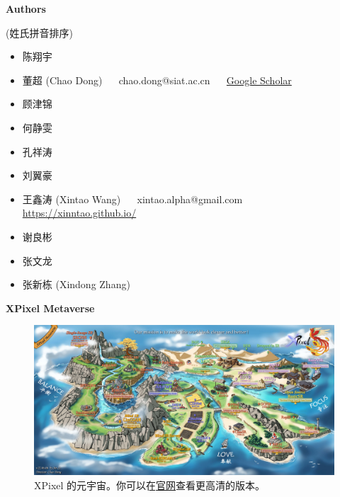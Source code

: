 \documentclass[../main.tex]{subfiles}
\begin{document}
\newpage

{\Large\textbf{Authors}}

(姓氏拼音排序)

\begin{itemize}
	\item 陈翔宇
	\item 董超 (Chao Dong) ~~ chao.dong@siat.ac.cn ~~ \href{https://scholar.google.com.hk/citations?user=OSDCB0UAAAAJ}{Google Scholar}
	\item 顾津锦
	\item 何静雯
	\item 孔祥涛
	\item 刘翼豪
	\item 王鑫涛 (Xintao Wang) ~~ xintao.alpha@gmail.com ~~ \url{https://xinntao.github.io/}
	\item 谢良彬
	\item 张文龙
	\item 张新栋 (Xindong Zhang)
\end{itemize}

\newpage
{\Large\textbf{ XPixel Metaverse}}

\begin{figure}[h]
	\vspace{1cm}
	\begin{center}
		\includegraphics[width=\linewidth]{figures/XPixelMetaverse_small.jpg}
		\caption{XPixel 的元宇宙。你可以在\href{https://xpixel.group/2022/06/06/poster.html}{官网}查看更高清的版本。}
	\end{center}
\end{figure}
\end{document}
